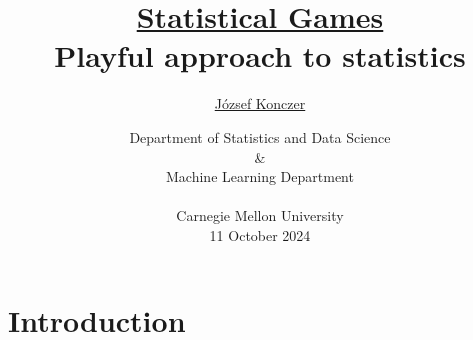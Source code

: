 \documentclass{beamer}
\theoremstyle{definition}
\begin{document}



\title[\href{https://arxiv.org/abs/2402.15892}{Statistical Games}]{\href{https://arxiv.org/abs/2402.15892}{Statistical Games} \\ {\small Playful approach to statistics}}
\author{\href{https://konczer.github.io/}{József Konczer}}
\date{Department of Statistics and Data Science \\ \& \\ Machine Learning Department
\\
\ 
\\ 
Carnegie Mellon University \\ 11 October 2024}

\begin{frame}
\titlepage
\end{frame}





\section{Introduction}
\end{document}
